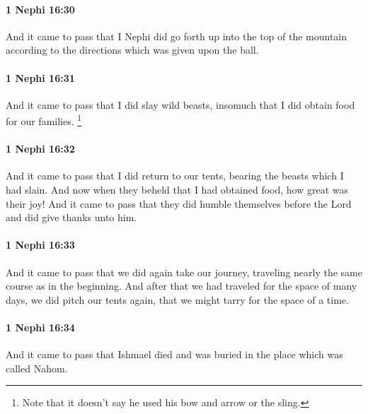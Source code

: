 		\paragraph{1 Nephi 16:30} %
			\label{1NEPHI-16-30}

			And it came to pass that I Nephi did go forth up into the top of the mountain
			according to the directions which was given upon the ball.

		\paragraph{1 Nephi 16:31} %
			\label{1NEPHI-16-31}

			And it came to pass that I did slay wild beasts,
			insomuch that I did obtain food for our families.%
				\footnote{%
					Note that it doesn't say he used his bow and arrow or the sling.
					}

		\paragraph{1 Nephi 16:32} %
			\label{1NEPHI-16-32}

			And it came to pass that I did return to our tents,
			bearing the beasts which I had slain.
			And now when they beheld that I had obtained food,
			how great was their joy!
			And it came to pass that they did humble themselves before the Lord
			and did give thanks unto him.

		\paragraph{1 Nephi 16:33} %
			\label{1NEPHI-16-33}

			And it came to pass that we did again take our journey,
			traveling nearly the same course as in the beginning.
			And after that we had traveled for the space of many days,
			we did pitch our tents again,
			that we might tarry for the space of a time.

		\paragraph{1 Nephi 16:34} %
			\label{1NEPHI-16-34}

			And it came to pass that Ishmael died
			and was buried in the place which was called Nahom.

